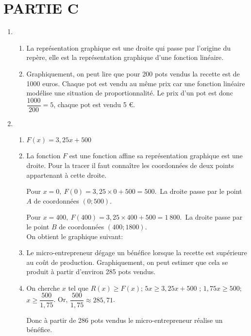 \section*{\hspace{20mm}\textbf{PARTIE C}}
\begin{enumerate}
    \item 
    \begin{enumerate}
        \item La représentation graphique est une droite qui passe par l’origine du repère, elle est la représentation graphique d’une fonction linéaire.
        \item Graphiquement, on peut lire que pour 200 pots vendus la recette est de 1000 euros. Chaque pot est vendu au même prix car une fonction linéaire modélise une situation de proportionnalité. Le prix d’un pot est donc $\dfrac{1000}{200}=5$, chaque pot est vendu 5 €.
    \end{enumerate}
    \item
    \begin{enumerate}
        \item $F(x)=3,25x+500$
        \item La fonction $F$ est une fonction affine sa représentation graphique est une droite. Pour la tracer il faut connaître les coordonnées de deux points appartenant à cette droite.
        
        \medskip
        Pour $x=0,~F(0)=3,25\times0+500=500$.~La droite passe par le point $A$ de coordonnées $(0 ; 500)$.
        
        \medskip
        Pour $x=400,~F(400)=3,25\times400+500=1~800$.~La droite passe par le point $B$ de coordonnées $(400 ; 1800)$.\\On obtient le graphique suivant:\\ 
        
 
        
        \item Le micro-entrepreneur dégage un bénéfice lorsque la recette est supérieure au coût de production. Graphiquement, on peut estimer que cela se produit à partir d'environ 285 pots vendus. 
        
        \item On cherche $x$ tel que $R(x)\geq F(x)$; $5x\geq 3,25x+500$ ; $1,75x\geq500$; $x\geq\dfrac{500}{1,75}$. Or,  $\dfrac{500}{1,75}\approx285,71$. 
        
        \medskip
        Donc à partir de 286 pots vendus le micro-entrepreneur réalise un bénéfice. 
        \end{enumerate}
 \end{enumerate}    
